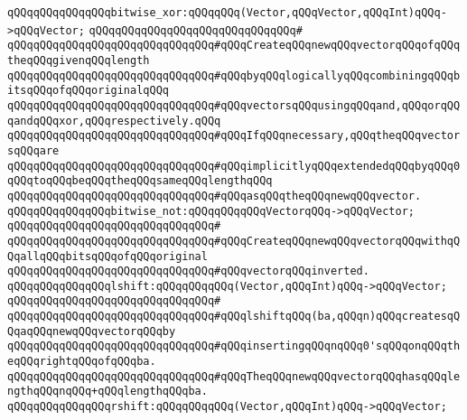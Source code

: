 \verb|qQQqqQQqqQQqqQQqbitwise_xor:qQQqqQQq(Vector,qQQqVector,qQQqInt)qQQq->qQQqVector;|\newline
\verb|qQQqqQQqqQQqqQQqqQQqqQQqqQQqqQQq#|\newline
\verb|qQQqqQQqqQQqqQQqqQQqqQQqqQQqqQQq#qQQqCreateqQQqnewqQQqvectorqQQqofqQQqtheqQQqgivenqQQqlength|\newline
\verb|qQQqqQQqqQQqqQQqqQQqqQQqqQQqqQQq#qQQqbyqQQqlogicallyqQQqcombiningqQQqbitsqQQqofqQQqoriginalqQQq|\newline
\verb|qQQqqQQqqQQqqQQqqQQqqQQqqQQqqQQq#qQQqvectorsqQQqusingqQQqand,qQQqorqQQqandqQQqxor,qQQqrespectively.qQQq|\newline
\verb|qQQqqQQqqQQqqQQqqQQqqQQqqQQqqQQq#qQQqIfqQQqnecessary,qQQqtheqQQqvectorsqQQqare|\newline
\verb|qQQqqQQqqQQqqQQqqQQqqQQqqQQqqQQq#qQQqimplicitlyqQQqextendedqQQqbyqQQq0qQQqtoqQQqbeqQQqtheqQQqsameqQQqlengthqQQq|\newline
\verb|qQQqqQQqqQQqqQQqqQQqqQQqqQQqqQQq#qQQqasqQQqtheqQQqnewqQQqvector.|\newline
\newline
\newline
\verb|qQQqqQQqqQQqqQQqbitwise_not:qQQqqQQqqQQqVectorqQQq->qQQqVector;|\newline
\verb|qQQqqQQqqQQqqQQqqQQqqQQqqQQqqQQq#|\newline
\verb|qQQqqQQqqQQqqQQqqQQqqQQqqQQqqQQq#qQQqCreateqQQqnewqQQqvectorqQQqwithqQQqallqQQqbitsqQQqofqQQqoriginal|\newline
\verb|qQQqqQQqqQQqqQQqqQQqqQQqqQQqqQQq#qQQqvectorqQQqinverted.|\newline
\newline
\newline
\verb|qQQqqQQqqQQqqQQqlshift:qQQqqQQqqQQq(Vector,qQQqInt)qQQq->qQQqVector;|\newline
\verb|qQQqqQQqqQQqqQQqqQQqqQQqqQQqqQQq#|\newline
\verb|qQQqqQQqqQQqqQQqqQQqqQQqqQQqqQQq#qQQqlshiftqQQq(ba,qQQqn)qQQqcreatesqQQqaqQQqnewqQQqvectorqQQqby|\newline
\verb|qQQqqQQqqQQqqQQqqQQqqQQqqQQqqQQq#qQQqinsertingqQQqnqQQq0'sqQQqonqQQqtheqQQqrightqQQqofqQQqba.|\newline
\verb|qQQqqQQqqQQqqQQqqQQqqQQqqQQqqQQq#qQQqTheqQQqnewqQQqvectorqQQqhasqQQqlengthqQQqnqQQq+qQQqlengthqQQqba.|\newline
\newline
\newline
\verb|qQQqqQQqqQQqqQQqrshift:qQQqqQQqqQQq(Vector,qQQqInt)qQQq->qQQqVector;|\newline
